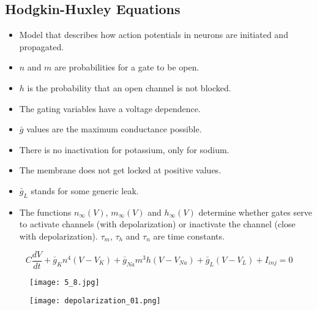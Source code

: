 \documentclass[main]{subfiles}
\begin{document}
\subsection{Hodgkin-Huxley Equations}
\begin{itemize}[noitemsep,nolistsep]
	\item Model that describes how action potentials in neurons are initiated and propagated.
	\item $n$ and $m$ are probabilities for a gate to be open.
	\item $h$ is the probability that an open channel is not blocked.
	\item The gating variables have a voltage dependence.
	\item $\bar{g}$ values are the maximum conductance possible.
	\item There is no inactivation for potassium, only for sodium.
	\item The membrane does not get locked at positive values.
	\item $\bar{g}_L$ stands for some generic leak.
	\item The functions $n_\infty(V)$, $m_\infty(V)$ and $h_\infty(V)$ determine whether gates serve to activate channels (with depolarization) or inactivate the channel (close with depolarization). $\tau_m$, $\tau_h$ and $\tau_n$ are time constants.
\end{itemize}
\[C\frac{dV}{dt}+\bar{g}_Kn^4(V-V_K)+\bar{g}_{Na}m^3h(V-V_{Na})+\bar{g}_L(V-V_L)+I_{inj}=0\]

\begin{figure}[H]
	\centering
	\texttt{[image: 5\_8.jpg]}
\end{figure} 
\begin{figure}[H]
	\centering
	\texttt{[image: depolarization\_01.png]}
\end{figure} 
\end{document}
